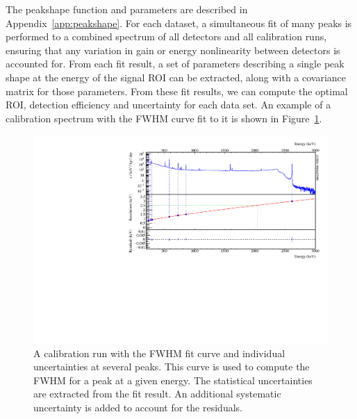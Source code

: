 \documentclass[/main.tex]{subfiles}
\begin{document}
The peakshape function and parameters are described in Appendix~\ref{app:peakshape}.
For each dataset, a simultaneous fit of many peaks is performed to a combined spectrum of all detectors and all calibration runs, ensuring that any variation in gain or energy nonlinearity between detectors is accounted for.
From each fit result, a set of parameters describing a single peak shape at the energy of the signal ROI can be extracted, along with a covariance matrix for those parameters.
From these fit results, we can compute the optimal ROI, detection efficiency and uncertainty for each data set.
An example of a calibration spectrum with the FWHM curve fit to it is shown in Figure~\ref{fig:fwhmcal}.
\begin{figure}[h]
  \centering
  \includegraphics[width=.9\linewidth]{fwhmcal}
  \caption[FWHM extracted from a  calibration spectrum]{\label{fig:fwhmcal}
    A  calibration run with the FWHM fit curve and individual uncertainties at several peaks. This curve is used to compute the FWHM for a peak at a given energy. The statistical uncertainties are extracted from the fit result. An additional systematic uncertainty is added to account for the residuals.
  }
\end{figure}
\end{document}
